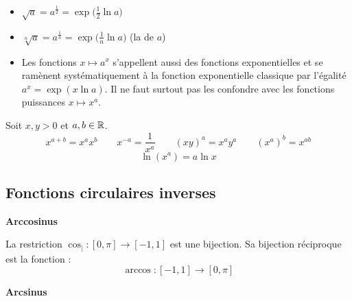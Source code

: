 \documentclass[10pt,class=article,crop=false]{standalone}
\begin{document}
\begin{multicols}{2}
\begin{remarque*}
	\sauteligne
	\begin{itemize}
		\item $\sqrt a = a^\frac12 = \exp\big( \frac12 \ln a\big)$
		\item $\sqrt[n] a = a^\frac1n = \exp\big( \frac1n \ln a\big)$ (la  de $a$)
		\item Les fonctions $x \mapsto a^x$ s'appellent aussi des fonctions exponentielles et
		se ramènent systématiquement à la fonction exponentielle classique
		par l'égalité $a^x = \exp(x \ln a)$. Il ne faut surtout pas les confondre avec les fonctions puissances
		$x \mapsto x^a$.
	\end{itemize}
\end{remarque*}



	Soit $x,y >0$ et $a,b\in \mathbb{R}$.
$$x^{a+b} = x^ax^b
\qquad
x^{-a}=\frac{1}{x^a}
\qquad
(xy)^a  = x^ay^a
\qquad
(x^a)^b = x^{ab}$$
$$\ln(x^a) = a \ln x$$




\subsection{Fonctions circulaires inverses}

\textbf{Arccosinus}

La restriction
$\cos_| : [0,\pi] \to [-1,1]$
est une bijection.
Sa bijection réciproque est la fonction  :
$$\arccos : [-1,1] \to [0,\pi]$$





\mybox{$\displaystyle \arccos'(x) = \frac{-1}{\sqrt{1-x^2}} \qquad \forall x \in {}]-1,1[$}




\textbf{Arcsinus}


\end{multicols}
\end{document}
